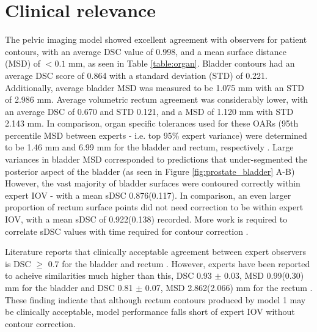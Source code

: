 \section{Clinical relevance}
The pelvic imaging model showed excellent
agreement with observers for patient contours, with an average DSC value of 0.998, and a mean surface distance (MSD) of $<0.1$ mm, as seen in Table \ref{table:organ}. Bladder contours had an average DSC score of 0.864 with a standard deviation (STD) of 0.221. Additionally, average bladder MSD was measured to be 1.075 mm with an STD of 2.986 mm.
Average volumetric rectum agreement was considerably lower, with an average DSC of 0.670 and STD 0.121, and a MSD of 1.120 mm with STD 2.143 mm.
In comparison, organ specific tolerances used for these OARs (95th percentile MSD between experts - i.e. top 95\% expert variance) were determined to be 1.46 mm and 6.99 mm
for the bladder and rectum, respectively \cite{Roach_2019, Nikolov_2018}. Large variances in bladder MSD corresponded to predictions that under-segmented the posterior aspect of the bladder (as seen in Figure \ref{fig:prostate_bladder} A-B) However, the vast majority of bladder surfaces were contoured correctly within expert IOV - with a mean sDSC 0.876(0.117). In comparison, an even larger proportion of rectum surface points did not need correction to be within expert IOV, with a mean sDSC of 0.922(0.138) recorded. More work is required to correlate sDSC values with time required for contour correction \cite{Nikolov_2018, Vaassen_2020}.

Literature reports that clinically acceptable agreement between expert observers is DSC $\geq$ 0.7 for the bladder and rectum \cite{Roach_2019}.
However, experts have been reported to acheive similarities much higher than this,  DSC 0.93 $\pm$ 0.03, MSD 0.99(0.30) mm for the bladder and DSC 0.81 $\pm$ 0.07, MSD 2.862(2.066) mm for the rectum \cite{Roach_2019}. These finding indicate that although rectum contours produced by model 1 may be clinically acceptable, model performance falls short of expert IOV without contour correction.

